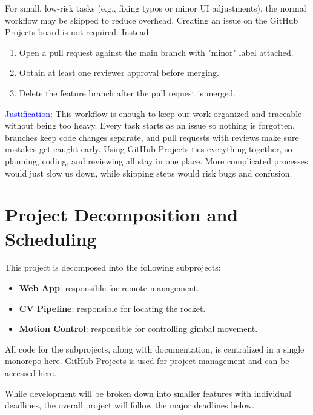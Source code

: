 \documentclass{article}
\begin{document}
For small, low-risk tasks (e.g., fixing typos or minor UI adjustments), the
normal workflow may be skipped to reduce overhead. Creating an issue on the
GitHub Projects board is not required. Instead:
\begin{enumerate}
  \item Open a pull request against the main branch with "minor" label attached.
  \item Obtain at least one reviewer approval before merging.
  \item Delete the feature branch after the pull request is merged.
\end{enumerate}

\textcolor{blue}{Justification:} This workflow is enough to keep our work organized
and traceable without being too heavy. Every task starts as an issue so nothing
is forgotten, branches keep code changes separate, and pull requests with reviews
make sure mistakes get caught early. Using GitHub Projects ties everything together,
so planning, coding, and reviewing all stay in one place. More complicated processes
would just slow us down, while skipping steps would risk bugs and confusion.

\section{Project Decomposition and Scheduling}

This project is decomposed into the following subprojects:

\begin{itemize}
  \item \textbf{Web App}: responsible for remote management.
  \item \textbf{CV Pipeline}: responsible for locating the rocket.
  \item \textbf{Motion Control}: responsible for controlling gimbal movement.
\end{itemize}

All code for the subprojects, along with documentation, is centralized in a
single monorepo \href{https://github.com/ZifanSi/vision-guided-tracker}{here}.
GitHub Projects is used for project management and can be accessed
\href{https://github.com/users/ZifanSi/projects/1}{here}.

While development will be broken down into smaller features with individual
deadlines, the overall project will follow the major deadlines below.
\end{document}
